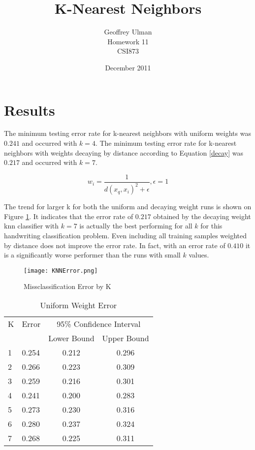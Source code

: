 \documentclass{article}
\begin{document}
\title{K-Nearest Neighbors}
\author{Geoffrey Ulman\\
        Homework 11\\
        CSI873}
\date{December 2011}
\maketitle

\section{Results}\label{Results}

The minimum testing error rate for k-nearest neighbors with uniform weights was \(0.241\) and occurred with \(k=4\). The minimum testing error rate for k-nearest neighbors with weights decaying by distance according to Equation \ref{decay} was \(0.217\) and occurred with \(k=7\).

\begin{equation}\label{decay}
w_i = \frac{1}{d \left( x_q , x_i \right)^2 + \epsilon } , \epsilon = 1
\end{equation}

The trend for larger k for both the uniform and decaying weight runs is shown on Figure \ref{plot1}. It indicates that the error rate of \(0.217\) obtained by the decaying weight knn classifier with \(k=7\) is actually the best performing for all \(k\) for this handwriting classification problem. Even including all training samples weighted by distance does not improve the error rate. In fact, with an error rate of \(0.410\) it is a significantly worse performer than the runs with small \(k\) values.

\begin{figure}
\centering
\texttt{[image: KNNError.png]}
\caption{Missclassification Error by K}
\label{plot1}
\end{figure}

\begin{table}
\caption{Uniform Weight Error}
\begin{center}
\begin{tabular}{llcc}
\toprule
K & Error & \multicolumn{2}{c}{95\% Confidence Interval} \\
\cmidrule(r){3-4}
& & Lower Bound & Upper Bound \\
\midrule
1 & 0.254 & 0.212 & 0.296 \\
2 & 0.266 & 0.223 & 0.309 \\
3 & 0.259 & 0.216 & 0.301 \\
4 & 0.241 & 0.200 & 0.283 \\
5 & 0.273 & 0.230 & 0.316 \\
6 & 0.280 & 0.237 & 0.324 \\
7 & 0.268 & 0.225 & 0.311 \\
\bottomrule
\end{tabular}
\label{error1}
\end{center}
\end{table}
\end{document}

